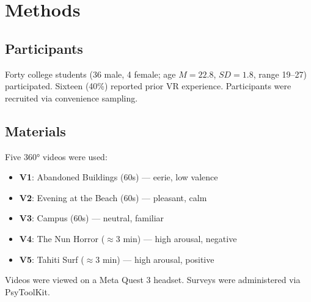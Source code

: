 \documentclass[12pt]{article}
\begin{document}
\section{Methods}

\subsection{Participants}
Forty college students (36 male, 4 female; age $M = 22.8$, $SD = 1.8$, range 19--27) participated. Sixteen (40\%) reported prior VR experience. Participants were recruited via convenience sampling.

\subsection{Materials}
Five 360° videos were used:
\begin{itemize}
    \item \textbf{V1}: Abandoned Buildings (60s) --- eerie, low valence
    \item \textbf{V2}: Evening at the Beach (60s) --- pleasant, calm
    \item \textbf{V3}: Campus (60s) --- neutral, familiar
    \item \textbf{V4}: The Nun Horror ($\approx$3 min) --- high arousal, negative
    \item \textbf{V5}: Tahiti Surf ($\approx$3 min) --- high arousal, positive
\end{itemize}
Videos were viewed on a Meta Quest 3 headset. Surveys were administered via PsyToolKit.
\end{document}
